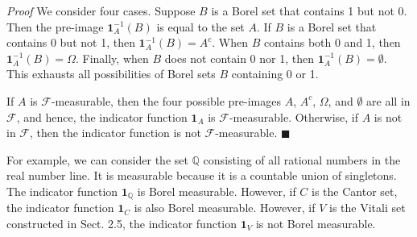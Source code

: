 \noindent\textit{Proof} We consider four cases. Suppose $B$ is a Borel set that contains 1 but not 0. Then the pre-image $\mathbf{1}_A^{-1}(B)$ is equal to the set $A$. If $B$ is a Borel set that contains 0 but not 1, then $\mathbf{1}_A^{-1}(B) = A^c$. When $B$ contains both 0 and 1, then $\mathbf{1}_A^{-1}(B) = \Omega$. Finally, when $B$ does not contain 0 nor 1, then $\mathbf{1}_A^{-1}(B) = \emptyset$. This exhausts all possibilities of Borel sets $B$ containing 0 or 1.

If $A$ is $\mathcal{F}$-measurable, then the four possible pre-images $A$, $A^c$, $\Omega$, and $\emptyset$ are all in $\mathcal{F}$, and hence, the indicator function $\mathbf{1}_A$ is $\mathcal{F}$-measurable. Otherwise, if $A$ is not in $\mathcal{F}$, then the indicator function is not $\mathcal{F}$-measurable. \hfill $\blacksquare$

For example, we can consider the set $\mathbb{Q}$ consisting of all rational numbers in the real number line. It is measurable because it is a countable union of singletons. The indicator function $\mathbf{1}_{\mathbb{Q}}$ is Borel measurable. However, if $C$ is the Cantor set, the indicator function $\mathbf{1}_C$ is also Borel measurable. However, if $V$ is the Vitali set constructed in Sect. 2.5, the indicator function $\mathbf{1}_V$ is not Borel measurable.